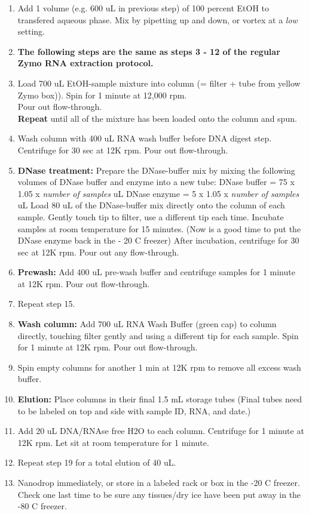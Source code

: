 \documentclass[a4paper,12pt,twoside]{book}
\begin{document}
\begin{enumerate}
	\item Add 1 volume (e.g. 600  uL in previous step) of 100 percent EtOH to transfered aqueous phase. Mix by pipetting up and down, or vortex at a {\em low} setting. 
	\item[] {\bf The following steps are the same as steps 3 - 12 of the regular Zymo RNA extraction protocol.}
	\item Load 700 uL EtOH-sample mixture into column (= filter + tube from yellow Zymo box)). Spin for 1 minute at 12,000 rpm.  \\
	Pour out flow-through. \\
	{\bf Repeat} until all of the mixture has been loaded onto the column and spun. 
	\item Wash column with 400 uL RNA wash buffer before DNA digest step. Centrifuge for 30 sec at 12K rpm. Pour out flow-through.
	\item {\bf DNase treatment:} 
	\subitem Prepare the DNase-buffer mix by mixing the following volumes of DNase buffer and enzyme into a new tube: 
	\subitem DNase buffer = 75 x 1.05 x {\em number of samples}  uL 
	\subitem DNase enzyme =  5 x 1.05 x {\em number of samples} uL 
	\subitem Load 80 uL of the DNase-buffer mix directly onto the column of each sample. Gently touch tip to filter, use a different tip each time. 
	\subitem Incubate samples at room temperature for 15 minutes.  (Now is a good time to put the DNase enzyme back in the - 20 C freezer)
	\subitem After incubation, centrifuge for 30 sec at 12K rpm. Pour out any flow-through. 
	\item {\bf Prewash:} Add 400 uL pre-wash buffer and centrifuge samples for 1 minute at 12K rpm. Pour out flow-through.
	\item Repeat step 15. 
	\item {\bf Wash column:} Add  700 uL RNA Wash Buffer (green cap) to column directly, touching filter gently and using a different tip for each sample.  Spin for 1 minute at 12K rpm.  Pour out flow-through. 
	\item Spin empty columns for another 1 min at 12K rpm to remove all excess wash buffer. 
	\item{\bf Elution:} Place columns in their final 1.5 mL storage tubes 
	(Final tubes need to be labeled on top and side with sample ID, RNA, and date.) 
	\item[] Add 20 uL DNA/RNAse free H2O to each column.  Centrifuge for 1 minute at 12K rpm.  Let sit at room temperature for 1 minute. 
	\item Repeat step 19 for a total elution of 40 uL. 
	\item Nanodrop immediately, or store in a labeled rack or box in the -20 C freezer. 
	\subitem Check one last time to be sure any tissues/dry ice have been put away in the -80 C freezer. 
	

\end{enumerate}
\end{document}
